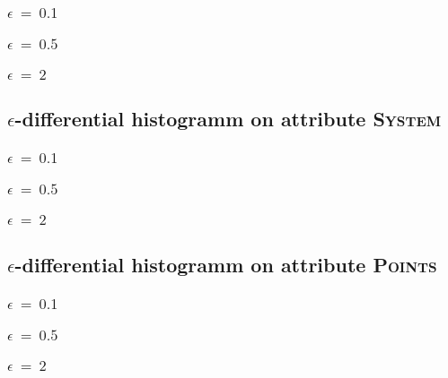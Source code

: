 \documentclass{report}
\begin{document}
			\subsubsection{$\epsilon \ = \ 0.1$}
			\startsubsection
			\closesection
			\subsubsection{$\epsilon \ = \ 0.5$}
			\startsubsection
			\closesection
			\subsubsection{$\epsilon \ = \ 2$}
			\startsubsection
			\closesection
		\closesection
		\subsection{$\epsilon$-differential histogramm on attribute \textsc{System}}
		\startsubsection
			\subsubsection{$\epsilon \ = \ 0.1$}
			\startsubsection
			\closesection
			\subsubsection{$\epsilon \ = \ 0.5$}
			\startsubsection
			\closesection
			\subsubsection{$\epsilon \ = \ 2$}
			\startsubsection
			\closesection
		\closesection
		\subsection{$\epsilon$-differential histogramm on attribute \textsc{Points}}
		\startsubsection
			\subsubsection{$\epsilon \ = \ 0.1$}
			\startsubsection
			\closesection
			\subsubsection{$\epsilon \ = \ 0.5$}
			\startsubsection
			\closesection
			\subsubsection{$\epsilon \ = \ 2$}
			\startsubsection
			\closesection
		\closesection
	\closesection
\end{document}
